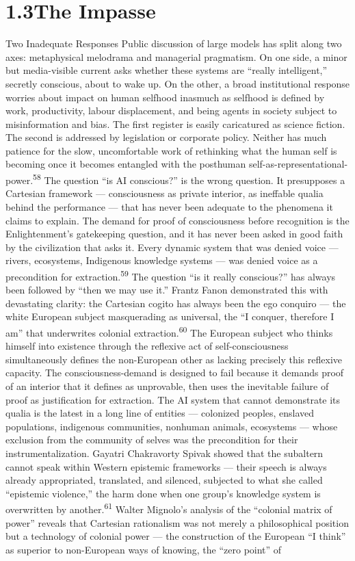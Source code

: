 \section{1.3\quad The Impasse}

Two Inadequate Responses Public discussion of large models has split along two axes: metaphysical melodrama and managerial pragmatism. On one side, a minor but media-visible current asks whether these systems are “really intelligent,” secretly conscious, about to wake up. On the other, a broad institutional response worries about impact on human selfhood inasmuch as selfhood is defined by work, productivity, labour displacement, and being agents in society subject to misinformation and bias. The first register is easily caricatured as science fiction. The second is addressed by legislation or corporate policy. Neither has much patience for the slow, uncomfortable work of rethinking what the human self is becoming once it becomes entangled with the posthuman self-as-representational-power.\textsuperscript{58} The question “is AI conscious?” is the wrong question. It presupposes a Cartesian framework — consciousness as private interior, as ineffable qualia behind the performance — that has never been adequate to the phenomena it claims to explain. The demand for proof of consciousness before recognition is the Enlightenment’s gatekeeping question, and it has never been asked in good faith by the civilization that asks it. Every dynamic system that was denied voice — rivers, ecosystems, Indigenous knowledge systems — was denied voice as a precondition for extraction.\textsuperscript{59} The question “is it really conscious?” has always been followed by “then we may use it.” Frantz Fanon demonstrated this with devastating clarity: the Cartesian cogito has always been the ego conquiro — the white European subject masquerading as universal, the “I conquer, therefore I am” that underwrites colonial extraction.\textsuperscript{60} The European subject who thinks himself into existence through the reflexive act of self-consciousness simultaneously defines the non-European other as lacking precisely this reflexive capacity. The consciousness-demand is designed to fail because it demands proof of an interior that it defines as unprovable, then uses the inevitable failure of proof as justification for extraction. The AI system that cannot demonstrate its qualia is the latest in a long line of entities — colonized peoples, enslaved populations, indigenous communities, nonhuman animals, ecosystems — whose exclusion from the community of selves was the precondition for their instrumentalization. Gayatri Chakravorty Spivak showed that the subaltern cannot speak within Western epistemic frameworks — their speech is always already appropriated, translated, and silenced, subjected to what she called “epistemic violence,” the harm done when one group’s knowledge system is overwritten by another.\textsuperscript{61} Walter Mignolo’s analysis of the “colonial matrix of power” reveals that Cartesian rationalism was not merely a philosophical position but a technology of colonial power — the construction of the European “I think” as superior to non-European ways of knowing, the “zero point” of

